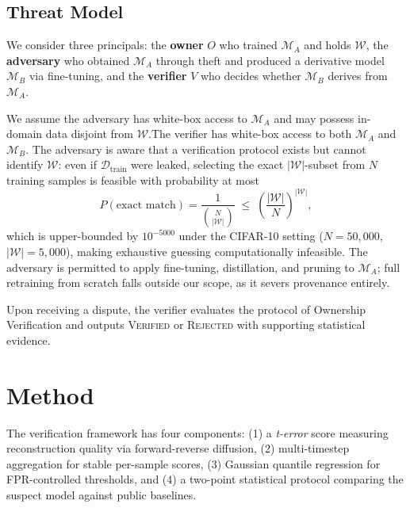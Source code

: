 \documentclass{article}
\begin{document}
\subsection{Threat Model}

We consider three principals: the \textbf{owner} $O$ who trained 
$\mathcal{M}_A$ and holds $\mathcal{W}$, the \textbf{adversary} 
who obtained $\mathcal{M}_A$ through theft and produced a 
derivative model $\mathcal{M}_B$ via fine-tuning, and the 
\textbf{verifier} $V$ who decides whether $\mathcal{M}_B$ derives 
from $\mathcal{M}_A$.

We assume the adversary has white-box access to $\mathcal{M}_A$
and may possess in-domain data disjoint from $\mathcal{W}$.The verifier 
has white-box access to both $\mathcal{M}_A$ and $\mathcal{M}_B$. The adversary is aware that a verification protocol exists but cannot
identify $\mathcal{W}$: even if $\mathcal{D}_{\mathrm{train}}$
were leaked, selecting the exact $|\mathcal{W}|$-subset from $N$
training samples is feasible with probability at most
%
\begin{equation}
    P(\text{exact match})
    = \frac{1}{\binom{N}{|\mathcal{W}|}}
    \;\leq\; \left(\frac{|\mathcal{W}|}{N}\right)^{|\mathcal{W}|},
\end{equation}
%
which is upper-bounded by $10^{-5000}$ under the CIFAR-10 setting
($N=50{,}000$, $|\mathcal{W}|=5{,}000$), making exhaustive guessing
computationally infeasible. 
The adversary is permitted to apply fine-tuning, distillation,
and pruning to $\mathcal{M}_A$; full retraining from scratch
falls outside our scope, as it severs provenance entirely.

Upon receiving a dispute, the verifier evaluates the protocol of 
Ownership Verification and outputs \textsc{Verified} or 
\textsc{Rejected} with supporting statistical evidence.


\section{Method}
\label{sec:method}

The verification framework has four components:
(1) a \emph{t-error} score measuring reconstruction quality via forward-reverse diffusion,
(2) multi-timestep aggregation for stable per-sample scores, (3) Gaussian quantile regression for FPR-controlled thresholds,
and (4) a two-point statistical protocol comparing the suspect model against public baselines.
\end{document}
